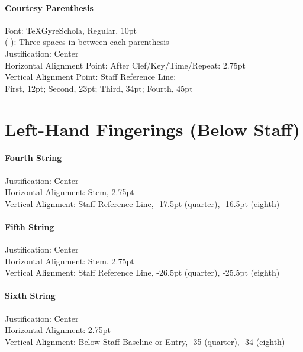 \documentclass[]{memoir}
\begin{document}
\paragraph{Courtesy Parenthesis}
\label{sec:courtesy-parenthesis}

Font: TeXGyreSchola, Regular, 10pt\\
(   ): Three spaces in between each parenthesis\\
Justification: Center\\
Horizontal Alignment Point: After Clef/Key/Time/Repeat: 2.75pt\\
Vertical Alignment Point: Staff Reference Line:\\
\indent First, 12pt; Second, 23pt; Third, 34pt; Fourth, 45pt

\section{Left-Hand Fingerings (Below Staff)}
\label{sec:left-hand-fingerings}

\paragraph{Fourth String}
\label{sec:fourth-string}

Justification: Center\\
Horizontal Alignment: Stem, 2.75pt\\
Vertical Alignment: Staff Reference Line, -17.5pt (quarter), -16.5pt (eighth)

\paragraph{Fifth String}
\label{sec:fifth-string}

Justification: Center\\
Horizontal Alignment: Stem, 2.75pt\\
Vertical Alignment: Staff Reference Line, -26.5pt (quarter), -25.5pt (eighth)

\paragraph{Sixth String}
\label{sec:sixth-string}

Justification: Center\\
Horizontal Alignment: 2.75pt\\
Vertical Alignment: Below Staff Baseline or Entry, -35 (quarter), -34 (eighth)\\
\end{document}
